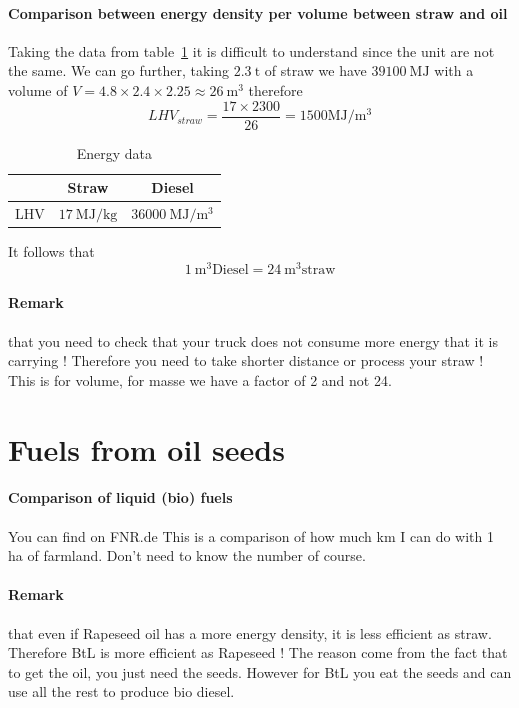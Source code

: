\documentclass[10pt,a4paper]{article}
\begin{document}
\paragraph{Comparison between energy density per volume between straw and oil}

Taking the data from table~\ref{energy_data} it is difficult to understand since the unit are not the same. We can go further, taking $\SI{2.3}{\tonne}$ of straw we have $\SI{39100}{\mega\joule} $ with a volume of $V = 4.8 \times 2.4 \times 2.25 \approx \SI{26}{\cubic \meter}$ therefore $$ LHV_{straw}= \frac{17\times 2300}{26} = 1500 \si{\mega\joule\per\cubic\meter}  $$

\begin{table}[h]
\centering
\begin{tabular}{|c|c|c|}
\hline 
 & Straw & Diesel \\ 
\hline 
LHV & $\SI{17}{\mega\joule\per\kilo\gram}$ & $\SI{36000}{\mega\joule\per\cubic \meter}$ \\ 
\hline 
\end{tabular}
\label{energy_data} 
\caption{Energy data}
\end{table}



It follows that $$ \SI{1}{\cubic\meter} \text{Diesel}= \SI{24}{\cubic\meter} \text{straw}$$ 


\paragraph{Remark}that you need to check that your truck does not consume more energy that it is carrying ! Therefore you need to take shorter distance or process your straw !
This is for volume, for masse we have a factor of 2 and not 24.


\section{Fuels from oil seeds}
\paragraph{Comparison of liquid (bio) fuels}
You can find on FNR.de This is a comparison of how much km I can do with 1 ha of farmland. Don't need to know the number of course.
\paragraph{Remark}that even if Rapeseed oil has a more energy density, it is less efficient as straw. Therefore BtL is more efficient as Rapeseed ! The reason come from the fact that to get the oil, you just need the seeds. However for BtL you eat the seeds and can use all the rest to produce bio diesel.
\end{document}
